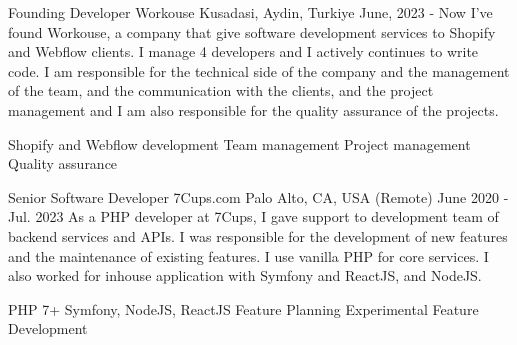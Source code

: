 

\begin{cventries}

    \cventry
    {Founding Developer} %
    {Workouse} %
    {Kusadasi, Aydin, Turkiye} %
    {June, 2023 - Now} %
    {
      I've found Workouse, a company that give software development services to Shopify and Webflow clients. I manage 4 developers and I actively continues to write code. I am responsible for the technical side of the company and the management of the team, and the communication with the clients, and the project management and I am also responsible for the quality assurance of the projects.
    }
    {
      \begin{cvsubentries}%
        \cvsubentry {} {Shopify and Webflow development} {} {} 
        \cvsubentry {} {Team management} {} {} 
        \cvsubentry {} {Project management} {} {} 
        \cvsubentry {} {Quality assurance} {} {} 
      \end{cvsubentries}
    }


    \cventry
    {Senior Software Developer} %
    {7Cups.com} %
    {Palo Alto, CA, USA (Remote)} %
    {June 2020 - Jul. 2023} %
    {
        As a PHP developer at 7Cups, I gave support to development team of backend services and APIs. I was responsible for the development of new features and the maintenance of existing features. I use vanilla PHP for core services. I also worked for inhouse application with Symfony and ReactJS, and NodeJS. 
    }
    {
      \begin{cvsubentries}%
        \cvsubentry {} {PHP 7+} {} {} 
        \cvsubentry {} {Symfony, NodeJS, ReactJS} {} {} 
        \cvsubentry {} {Feature Planning} {} {} 
        \cvsubentry {} {Experimental Feature Development} {} {} 
      \end{cvsubentries}
    }


\end{cventries}
